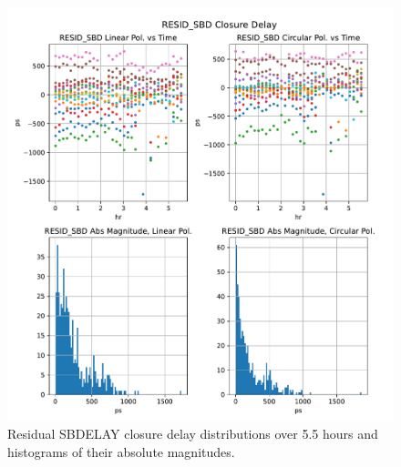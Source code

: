 \documentclass[letterpaper,twoside,12pt]{article}
\begin{document}
\begin{figure}[ht!]
  \begin{center}
  \includegraphics[width=38pc]{RESID_SBD_Closure_Delay.pdf}
  \caption{\small Residual SBDELAY closure delay distributions over 5.5 hours and histograms of their absolute magnitudes.}
  \label{resid_sbd}
  \end{center}
\end{figure}
\end{document}
